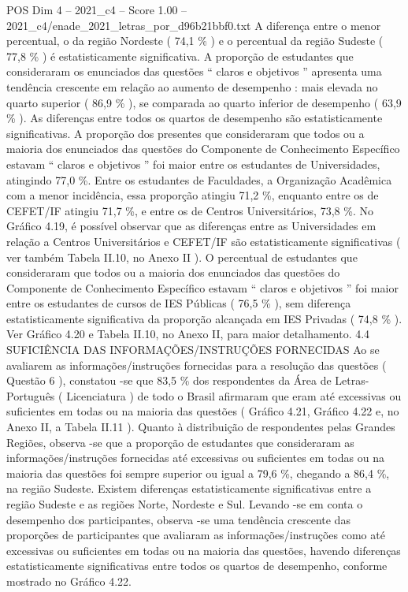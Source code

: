 \begin{textsample}{POS Dim 4 – 2021\_c4 – Score 1.00 – 2021\_c4/enade\_2021\_letras\_por\_d96b21bbf0.txt}
A diferença entre o menor percentual, o da região Nordeste ( 74,1 \% ) e o percentual da região Sudeste ( 77,8 \% ) é estatisticamente significativa.
A proporção de estudantes que consideraram os enunciados das questões “ claros e objetivos ” apresenta uma tendência crescente em relação ao aumento de desempenho : mais elevada no quarto superior ( 86,9 \% ), se comparada ao quarto inferior de desempenho ( 63,9 \% ).
As diferenças entre todos os quartos de desempenho são estatisticamente significativas.
A proporção dos presentes que consideraram que todos ou a maioria dos enunciados das questões do Componente de Conhecimento Específico estavam “ claros e objetivos ” foi maior entre os estudantes de Universidades, atingindo 77,0 \%.
Entre os estudantes de Faculdades, a Organização Acadêmica com a menor incidência, essa proporção atingiu 71,2 \%, enquanto entre os de CEFET/IF atingiu 71,7 \%, e entre os de Centros Universitários, 73,8 \%.
No Gráfico 4.19, é possível observar que as diferenças entre as Universidades em relação a Centros Universitários e CEFET/IF são estatisticamente significativas ( ver também Tabela II.10, no Anexo II ).
O percentual de estudantes que consideraram que todos ou a maioria dos enunciados das questões do Componente de Conhecimento Específico estavam “ claros e objetivos ” foi maior entre os estudantes de cursos de IES Públicas ( 76,5 \% ), sem diferença estatisticamente significativa da proporção alcançada em IES Privadas ( 74,8 \% ).
Ver Gráfico 4.20 e Tabela II.10, no Anexo II, para maior detalhamento. 4.4 SUFICIÊNCIA DAS INFORMAÇÕES/INSTRUÇÕES FORNECIDAS Ao se avaliarem as informações/instruções fornecidas para a resolução das questões ( Questão 6 ), constatou -se que 83,5 \% dos respondentes da Área de Letras-Português ( Licenciatura ) de todo o Brasil afirmaram que eram até excessivas ou suficientes em todas ou na maioria das questões ( Gráfico 4.21, Gráfico 4.22 e, no Anexo II, a Tabela II.11 ).
Quanto à distribuição de respondentes pelas Grandes Regiões, observa -se que a proporção de estudantes que consideraram as informações/instruções fornecidas até excessivas ou suficientes em todas ou na maioria das questões foi sempre superior ou igual a 79,6 \%, chegando a 86,4 \%, na região Sudeste.
Existem diferenças estatisticamente significativas entre a região Sudeste e as regiões Norte, Nordeste e Sul.
Levando -se em conta o desempenho dos participantes, observa -se uma tendência crescente das proporções de participantes que avaliaram as informações/instruções como até excessivas ou suficientes em todas ou na maioria das questões, havendo diferenças estatisticamente significativas entre todos os quartos de desempenho, conforme mostrado no Gráfico 4.22.

\end{textsample}

